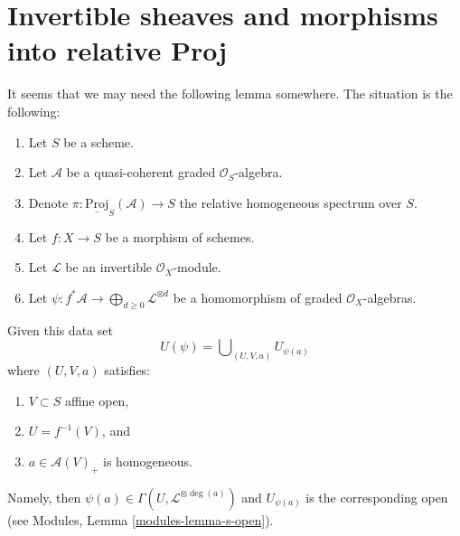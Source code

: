 \section{Invertible sheaves and morphisms into relative Proj}
\label{section-invertible-relative-proj}

\noindent
It seems that we may need the following lemma somewhere.
The situation is the following:
\begin{enumerate}
\item Let $S$ be a scheme.
\item Let $\mathcal{A}$ be a quasi-coherent graded $\mathcal{O}_S$-algebra.
\item Denote $\pi : \underline{\text{Proj}}_S(\mathcal{A}) \to S$ the relative
homogeneous spectrum over $S$.
\item Let $f : X \to S$ be a morphism of schemes.
\item Let $\mathcal{L}$ be an invertible $\mathcal{O}_X$-module.
\item Let $\psi : f^*\mathcal{A} \to
\bigoplus_{d \geq 0} \mathcal{L}^{\otimes d}$
be a homomorphism of graded $\mathcal{O}_X$-algebras.
\end{enumerate}
Given this data set
$$
U(\psi) = \bigcup\nolimits_{(U, V, a)} U_{\psi(a)}
$$
where $(U, V, a)$ satisfies:
\begin{enumerate}
\item $V \subset S$ affine open,
\item $U = f^{-1}(V)$, and
\item $a \in \mathcal{A}(V)_{+}$ is homogeneous.
\end{enumerate}
Namely, then $\psi(a) \in \Gamma(U, \mathcal{L}^{\otimes \deg(a)})$
and $U_{\psi(a)}$ is the corresponding open (see
Modules, Lemma \ref{modules-lemma-s-open}).

